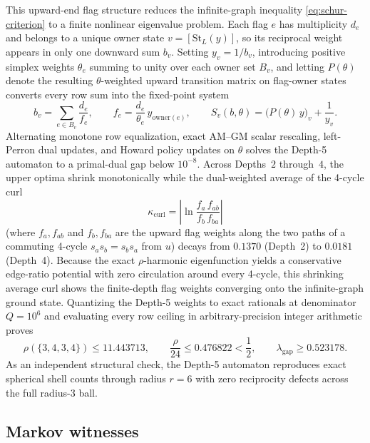 This upward-end flag structure reduces the infinite-graph inequality \eqref{eq:schur-criterion} to a finite nonlinear
eigenvalue problem. Each flag $e$ has multiplicity $d_e$ and belongs to a unique owner state $v = [\mathrm{St}_L(y)]$,
so its reciprocal weight appears in only one downward sum $b_v$. Setting $y_v = 1/b_v$, introducing positive simplex
weights $\theta_e$ summing to unity over each owner set $B_v$, and letting $P(\theta)$ denote the resulting
$\theta$-weighted upward transition matrix on flag-owner states converts every row sum into the fixed-point system
\begin{equation}
b_v = \sum_{e \in B_v} \frac{d_e}{f_e},
\qquad
f_e = \frac{d_e}{\theta_e}\, y_{\mathrm{owner}(e)},
\qquad
S_v(b, \theta) = \bigl(P(\theta)\, y\bigr)_v + \frac{1}{y_v}.
\label{eq:howard-row}
\end{equation}
Alternating monotone row equalization, exact AM--GM scalar rescaling, left-Perron dual updates, and Howard policy
updates on $\theta$ solves the Depth-5 automaton to a primal-dual gap below $10^{-8}$. Across Depths~$2$ through~$4$,
the upper optima shrink monotonically while the dual-weighted average of the 4-cycle curl
\begin{equation}
\kappa_{\mathrm{curl}} = \left|\ln \frac{f_a\, f_{ab}}{f_b\, f_{ba}}\right|
\label{eq:four-cycle-curl}
\end{equation}
(where $f_a, f_{ab}$ and $f_b, f_{ba}$ are the upward flag weights along the two paths of a commuting 4-cycle
$s_a s_b = s_b s_a$ from $u$) decays from $0.1370$ (Depth~2) to $0.0181$ (Depth~4). Because the exact $\rho$-harmonic
eigenfunction yields a conservative edge-ratio potential with zero circulation around every 4-cycle, this shrinking
average curl shows the finite-depth flag weights converging onto the infinite-graph ground state.
Quantizing the Depth-5 weights to exact rationals at denominator $Q = 10^6$ and evaluating every row ceiling in
arbitrary-precision integer arithmetic proves
\begin{equation}
\rho(\{3,4,3,4\}) \le 11.443713,
\qquad
\frac{\rho}{24} \le 0.476822 < \frac{1}{2},
\qquad
\lambda_{\mathrm{gap}} \ge 0.523178.
\label{eq:rho-upper}
\end{equation}
As an independent structural check, the Depth-5 automaton reproduces exact spherical shell counts through radius $r = 6$
with zero reciprocity defects across the full radius-3 ball.

\subsection{Markov witnesses}

